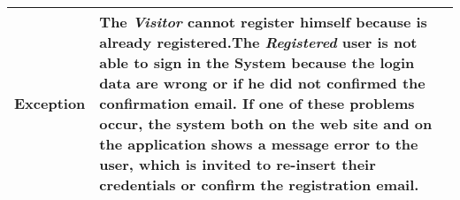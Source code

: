\begin{table}[H]
\begin{tabular}{|p{3.5cm}|p{10.3cm}|}
    \hline
    \textbf{\large{Exception}} 			& The \emph{Visitor} cannot register himself because is already registered.\newline The \emph{Registered} user                                         is not able to sign in the System because the login data are wrong or if he did not confirmed  the confirmation email. \newline
    										If one of these problems occur, the system both on the web site and on the application shows a message error to the user, which is invited to re-insert their credentials or confirm the registration email.\\
    
    \hline
    
    
    \end{tabular}
	
\end{table}

